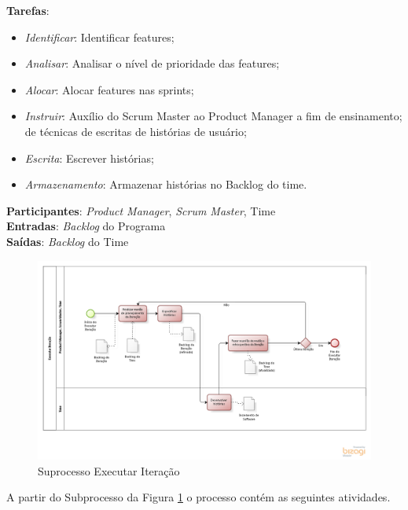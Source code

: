   \textbf{Tarefas}:
  \begin{itemize}
   \item \indent \textit{Identificar}: Identificar features;

   \item \indent \textit{Analisar}: Analisar o nível de prioridade das features;

   \item \indent \textit{Alocar}: Alocar features nas sprints;

   \item \indent \textit{Instruir}: Auxílio do Scrum Master ao Product Manager a fim de ensinamento; de técnicas de escritas de histórias de usuário;

   \item \indent \textit{Escrita}: Escrever histórias;

   \item \indent \textit{Armazenamento}: Armazenar histórias no Backlog do time.
  \end{itemize}

  \textbf{Participantes}: \textit{Product Manager}, \textit{Scrum Master}, Time\\

  \textbf{Entradas}: \textit{Backlog} do Programa \\

  \textbf{Saídas}:   \textit{Backlog} do Time \\

\begin{figure}[!htb]
\includegraphics[scale=0.5]{figuras/iteracao.png}
\caption{Suprocesso Executar Iteração}
\label{fig:iteracao}
\end{figure}

A partir do Subprocesso da Figura \ref{fig:iteracao} o processo contém as seguintes atividades.

